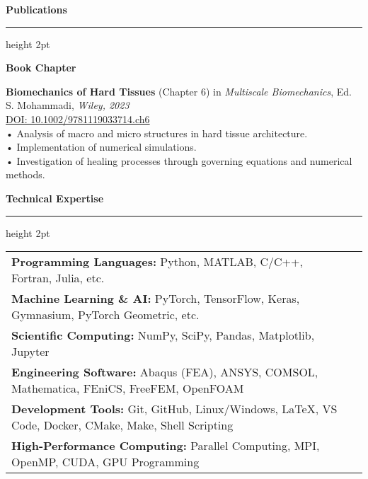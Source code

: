 \documentclass[11pt]{article}  %
\newenvironment{rSection}[1]{  %
    \vspace{0.5em}  %
    {\Large\bfseries\color{primary} #1}  %
    \vspace{0.3em}  %
    {\color{primary}\hrule height 2pt}  %
    \vspace{0.3em}  %
}{
    \vspace{0.05em}  %
}
\newcommand{\skill}[2]{\textbf{\color{text}#1:} \color{lighttext}#2}  %
\begin{document}
\begin{rSection}{Publications}
    \vspace{0.8em}
    {\color{primary}\textbf{Book Chapter}\par}
    \vspace{0.3em}
    
    \noindent\begin{minipage}{\textwidth}
        \textbf{Biomechanics of Hard Tissues} (Chapter 6) in \textit{Multiscale Biomechanics}, Ed. S. Mohammadi, \textit{\color{lighttext}Wiley, 2023}\\[0.3em]
        \href{https://doi.org/10.1002/9781119033714.ch6}{\small\color{primary}DOI: 10.1002/9781119033714.ch6}\\[0.3em]
        \small\color{lighttext}    • Analysis of macro and micro structures in hard tissue architecture.\\
        \small\color{lighttext}    • Implementation of numerical simulations.\\
        \small\color{lighttext}    • Investigation of healing processes through governing equations and numerical methods.\\
        \end{minipage}
    \end{rSection}

\begin{rSection}{Technical Expertise}  %
    \begin{tabular}{@{} l @{\hspace{6ex}} l}  %
        \skill{Programming Languages}{Python, MATLAB, C/C++, Fortran, Julia, etc.} \\[0.3em]  %
        \skill{Machine Learning \& AI}{PyTorch, TensorFlow, Keras, Gymnasium, PyTorch Geometric, etc.} \\[0.3em]  %
        \skill{Scientific Computing}{NumPy, SciPy, Pandas, Matplotlib, Jupyter} \\[0.3em]  %
        \skill{Engineering Software}{Abaqus (FEA), ANSYS, COMSOL, Mathematica, FEniCS, FreeFEM, OpenFOAM} \\[0.3em]  %
        \skill{Development Tools}{Git, GitHub, Linux/Windows, LaTeX, VS Code, Docker, CMake, Make, Shell Scripting} \\[0.3em]  %
        \skill{High-Performance Computing}{Parallel Computing, MPI, OpenMP, CUDA, GPU Programming}  %
        \end{tabular}
\end{rSection}
\end{document}

